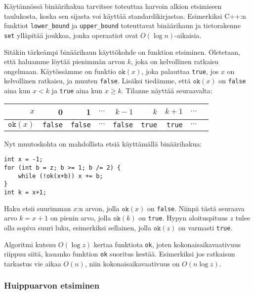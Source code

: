 Käytännössä binäärihakua tarvitsee toteuttaa
harvoin alkion etsimiseen taulukosta,
koska sen sijasta voi käyttää standardikirjastoa.
Esimerkiksi C++:n funktiot \texttt{lower\_bound}
ja \texttt{upper\_bound} toteuttavat binäärihaun
ja tietorakenne \texttt{set} ylläpitää joukkoa,
jonka operaatiot ovat $O(\log n)$-aikaisia.

Sitäkin tärkeämpi binäärihaun käyttökohde on 
funktion  etsiminen.
Oletetaan, että haluamme löytää pienimmän arvon $k$,
joka on kelvollinen ratkaisu ongelmaan.
Käytössämme on funktio $\texttt{ok}(x)$,
joka palauttaa \texttt{true}, jos $x$ on kelvollinen
ratkaisu, ja muuten \texttt{false}.
Lisäksi tiedämme, että $\texttt{ok}(x)$ on \texttt{false}
aina kun $x<k$ ja \texttt{true} aina kun $x \geq k$.
Tilanne näyttää seuraavalta:

\begin{center}
\begin{tabular}{r|rrrrrrrr}
$x$ & 0 & 1 & $\cdots$ & $k-1$ & $k$ & $k+1$ & $\cdots$ \\
\hline
$\texttt{ok}(x)$ & \texttt{false} & \texttt{false}
& $\cdots$ & \texttt{false} & \texttt{true} & \texttt{true} & $\cdots$ \\
\end{tabular}
\end{center}

\noindent
Nyt muutoskohta on mahdollista etsiä käyttämällä
binäärihakua:

\begin{lstlisting}
int x = -1;
for (int b = z; b >= 1; b /= 2) {
    while (!ok(x+b)) x += b;
}
int k = x+1;
\end{lstlisting}

Haku etsii suurimman $x$:n arvon,
jolla $\texttt{ok}(x)$ on \texttt{false}.
Niinpä tästä seuraava arvo $k=x+1$
on pienin arvo, jolla $\texttt{ok}(k)$ on \texttt{true}.
Hypyn aloituspituus $z$ tulee olla 
sopiva suuri luku, esimerkiksi sellainen,
jolla $\texttt{ok}(z)$ on varmasti \texttt{true}.

Algoritmi kutsuu $O(\log z)$ kertaa funktiota
\texttt{ok}, joten kokonaisaikavaativuus
riippuu siitä, kauanko funktion \texttt{ok}
suoritus kestää.
Esimerkiksi jos ratkaisun tarkastus
vie aikaa $O(n)$, niin kokonaisaikavaativuus
on $O(n \log z)$.

\subsubsection{Huippuarvon etsiminen}

